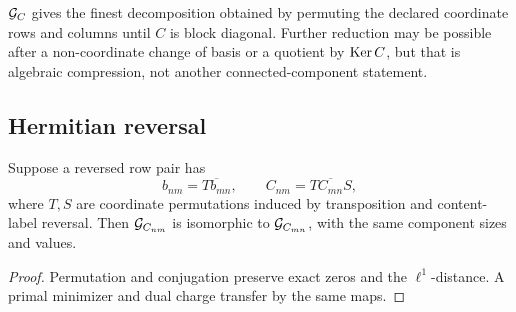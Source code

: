 \begin{remark}
\(\mathcal G_C\) gives the finest decomposition obtained by permuting the
declared coordinate rows and columns until \(C\) is block diagonal.
Further reduction may be possible after a non-coordinate change of
basis or a quotient by \(\operatorname{Ker} C\), but that is algebraic compression,
not another connected-component statement.
\end{remark}

\subsection{Hermitian reversal}

\begin{proposition}
\label{prop:reversal-transport}
Suppose a reversed row pair has
\[
 b_{nm}=\overline{T b_{mn}},
 \qquad
 C_{nm}=\overline{T C_{mn}S},
\]
where \(T,S\) are coordinate permutations induced by transposition and
content-label reversal. Then \(\mathcal G_{C_{nm}}\) is isomorphic to
\(\mathcal G_{C_{mn}}\), with the same component sizes and values.
\end{proposition}

\begin{proof}
Permutation and conjugation preserve exact zeros and the
\(\ell^1\)-distance. A primal minimizer and dual charge transfer by the
same maps.
\end{proof}
